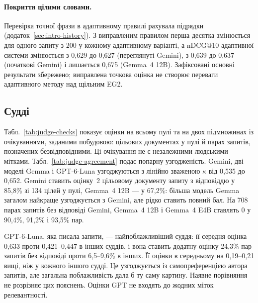 \begin{table}[p]
\centering
\caption{E5 проти EG2 на тих самих 4\,137 текстових документах. $\Delta$ --- парна різниця від E5 з 95\% бутстреп-інтервалом за запитами і некоригованим $p$ знакового перестановкового тесту; неоцінені документи вважаються нерелевантними, їхню частку подано.}
\label{tab:encoder-control}

\end{table}

\paragraph{Покриття цілими словами.} Перевірка точної фрази в адаптивному правилі рахувала підрядки (додаток~\ref{sec:intro-history}). З виправленим правилом перша десятка змінюється для одного запиту з 200 у кожному адаптивному варіанті, а nDCG@10 адаптивної системи змінюється з 0,629 до 0,627 (переглянуті Gemini), з 0,639 до 0,637 (початкові Gemini) і лишається 0,675 (Gemma~4 12B). Зафіксовані основні результати збережено; виправлена точкова оцінка не створює переваги адаптивного методу над щільним EG2.

\subsection{Судді}
Табл.~\ref{tab:judge-checks} показує оцінки на всьому пулі та на двох підмножинах із очікуваннями, заданими побудовою: цільових документах у пулі й парах запитів, позначених безвідповідними. Ці очікування не є незалежними людськими мітками. Табл.~\ref{tab:judge-agreement} подає попарну узгодженість. Gemini, дві моделі Gemma і GPT-6-Luna узгоджуються з лінійно зваженою $\kappa$ від 0,535 до 0,652. Gemini ставить оцінку~2 цільовому документу запиту з відповіддю у 85,8\% зі 134 цілей у пулі, Gemma~4 12B --- у 67,2\%: більша модель Gemma загалом найкраще узгоджується з Gemini, але рідко ставить повний бал. На 708 парах запитів без відповіді Gemini, Gemma~4 12B і Gemma~4 E4B ставлять 0 у 90,4\%, 91,2\% і 93,5\% пар.

GPT-6-Luna, яка писала запити, --- найпоблажливіший суддя: її середня оцінка 0,633 проти 0,421--0,447 в інших суддів, і вона ставить додатну оцінку 24,3\% пар запитів без відповіді проти 6,5--9,6\% в інших. Її оцінки в середньому на 0,19--0,21 вищі, ніж у кожного іншого судді. Це узгоджується із самопреференцією автора запитів, але загальна поблажливість дала б ту саму картину. Наявне порівняння не розрізняє цих пояснень. Оцінки GPT не входять до жодних міток релевантності.

